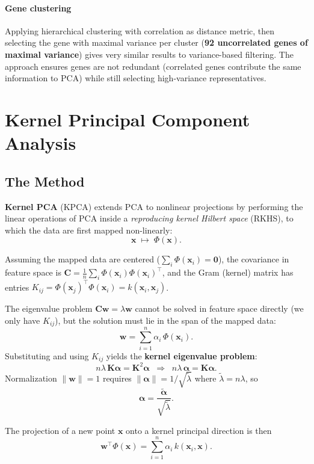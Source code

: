 \documentclass[11pt, oneside]{book}
\newcommand{\T}{^{\top}}
\begin{document}
\paragraph{Gene clustering}
Applying hierarchical clustering with correlation as distance metric, then selecting the
gene with maximal variance per cluster (\textbf{92 uncorrelated genes of maximal variance})
gives very similar results to variance-based filtering.
The approach ensures genes are not redundant (correlated genes contribute the same
information to PCA) while still selecting high-variance representatives.


\section{Kernel Principal Component Analysis}

\subsection{The Method}

\textbf{Kernel PCA} (KPCA) extends PCA to nonlinear projections by performing the
linear operations of PCA inside a \emph{reproducing kernel Hilbert space} (RKHS), to
which the data are first mapped non-linearly:
\[
  \bm{x} \;\mapsto\; \Phi(\bm{x}).
\]

Assuming the mapped data are centered ($\sum_i \Phi(\bm{x}_i) = \bm{0}$), the
covariance in feature space is
$\bm{C} = \frac{1}{n}\sum_i \Phi(\bm{x}_i)\Phi(\bm{x}_i)\T$,
and the Gram (kernel) matrix has entries $K_{ij} = \Phi(\bm{x}_j)\T\Phi(\bm{x}_i) = k(\bm{x}_i,\bm{x}_j)$.

The eigenvalue problem $\bm{C}\bm{w} = \lambda\bm{w}$ cannot be solved in feature space
directly (we only have $K_{ij}$), but the solution must lie in the span of the mapped
data:
\[
  \bm{w} = \sum_{i=1}^n \alpha_i\,\Phi(\bm{x}_i).
\]
Substituting and using $K_{ij}$ yields the \textbf{kernel eigenvalue problem}:
\[
  n\lambda\,\bm{K}\bm{\alpha} = \bm{K}^2\bm{\alpha}
  \;\;\Rightarrow\;\;
  n\lambda\,\bm{\alpha} = \bm{K}\bm{\alpha}.
\]
Normalization $\|\bm{w}\|=1$ requires $\|\bm{\alpha}\| = 1/\sqrt{\tilde\lambda}$ where
$\tilde\lambda = n\lambda$, so
\[
  \bm{\alpha} = \frac{\tilde{\bm{\alpha}}}{\sqrt{\tilde\lambda}}.
\]

The projection of a new point $\bm{x}$ onto a kernel principal direction is then
\[
  \bm{w}\T\Phi(\bm{x}) = \sum_{i=1}^n \alpha_i\,k(\bm{x}_i,\bm{x}).
\]
\end{document}

